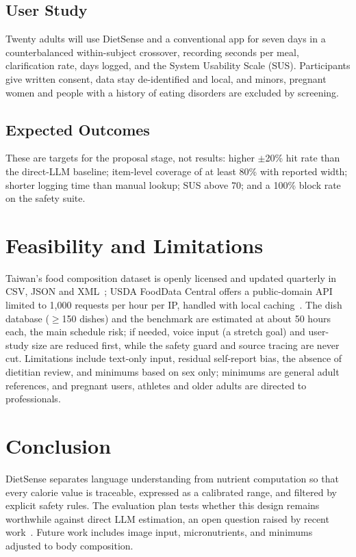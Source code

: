 \documentclass[conference]{IEEEtran}
\begin{document}
\subsection{User Study}
Twenty adults will use DietSense and a conventional app for seven days in a counterbalanced within-subject crossover, recording seconds per meal, clarification rate, days logged, and the System Usability Scale (SUS). Participants give written consent, data stay de-identified and local, and minors, pregnant women and people with a history of eating disorders are excluded by screening.

\subsection{Expected Outcomes}
These are targets for the proposal stage, not results: higher $\pm$20\% hit rate than the direct-LLM baseline; item-level coverage of at least 80\% with reported width; shorter logging time than manual lookup; SUS above 70; and a 100\% block rate on the safety suite.

\section{Feasibility and Limitations}
Taiwan's food composition dataset is openly licensed and updated quarterly in CSV, JSON and XML~\cite{tfda_db}; USDA FoodData Central offers a public-domain API limited to 1{,}000 requests per hour per IP, handled with local caching~\cite{usda_fdc}. The dish database ($\geq$150 dishes) and the benchmark are estimated at about 50 hours each, the main schedule risk; if needed, voice input (a stretch goal) and user-study size are reduced first, while the safety guard and source tracing are never cut. Limitations include text-only input, residual self-report bias, the absence of dietitian review, and minimums based on sex only; minimums are general adult references, and pregnant users, athletes and older adults are directed to professionals.

\section{Conclusion}
DietSense separates language understanding from nutrient computation so that every calorie value is traceable, expressed as a calibrated range, and filtered by explicit safety rules. The evaluation plan tests whether this design remains worthwhile against direct LLM estimation, an open question raised by recent work~\cite{coburn2026}. Future work includes image input, micronutrients, and minimums adjusted to body composition.



\end{document}
